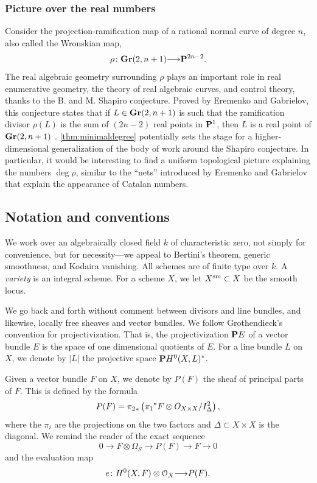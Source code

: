 \documentclass[11pt,reqno]{amsart}
\theoremstyle{plain}
\theoremstyle{definition}
\theoremstyle{remark}
\numberwithin{equation}{section}
\renewcommand{\k}{k}
\renewcommand{\to}{{\longrightarrow}}
\numberwithin{equation}{section}
\renewcommand{\O}{\mathcal O}
\begin{document}
\subsubsection{Picture over the real numbers}
Consider the projection-ramification map of a rational normal curve of degree $n$, also called the Wronskian map,
\[ \rho \from \Gr(2, n+1) \to \P^{2n-2}.\]
The real algebraic geometry surrounding $\rho$ plays an important role in real enumerative geometry, the theory of real algebraic curves, and control theory, thanks to the B. and M. Shapiro conjecture.
Proved by Eremenko and Gabrielov, this conjecture states that if $L \in \Gr(2, n+1)$ is such that the ramification divisor $\rho(L)$ is the sum of $(2n-2)$ real points in $\P^1$, then $L$ is a real point of $\Gr(2, n+1)$ \cite{sot:00, ere.gab:02}.
\autoref{thm:minimaldegree} potentially sets the stage for a higher-dimensional generalization of the body of work around the Shapiro conjecture.
In particular, it would be interesting to find a uniform topological picture explaining the numbers $\deg \rho$, similar to the ``nets'' introduced by Eremenko and Gabrielov that explain the appearance of Catalan numbers.

\subsection{Notation and conventions}
We work over an algebraically closed field $\k$ of characteristic zero, not simply for convenience, but for necessity---we appeal to Bertini's theorem, generic smoothness, and Kodaira vanishing.
All schemes are of finite type over $\k$.
A \emph{variety} is an integral scheme.
For a scheme $X$, we let $X^{\rm sm} \subset X$ be the smooth locus.

We go back and forth without comment between divisors and line bundles, and likewise, locally free sheaves and vector bundles.
We follow Grothendieck's convention for projectivization.
That is, the projectivization $\P E$ of a vector bundle $E$ is the space of one dimensional quotients of $E$.
For a line bundle $L$ on $X$, we denote by $|L|$ the projective space $\P H^0(X, L)^*$.

Given a vector bundle $F$ on $X$, we denote by $P(F)$ the sheaf of principal parts of $F$.
This is defined by the formula
\[ P(F) = {\pi_2}_* \left( {\pi_1}^* F \otimes \mathcal \O_{X \times X}/ I_{\Delta}^2 \right),\]
where the $\pi_i$ are the projections on the two factors and $\Delta \subset X \times X$ is the diagonal.
We remind the reader of the exact sequence
\[ 0 \to F \otimes \Omega_S \to P(F) \to F \to 0\]
and the evaluation map
\[ e \from H^0(X, F) \otimes \O_X \to P(F).\]
\end{document}
